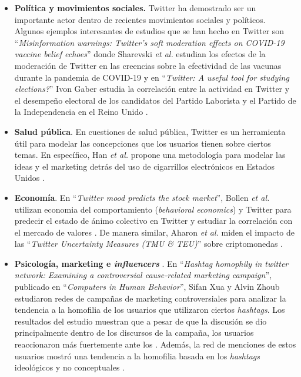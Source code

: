 \begin{itemize}

    \item \textbf{Política y movimientos sociales.} Twitter ha demostrado ser un importante actor dentro de recientes movimientos sociales y políticos. Algunos ejemplos interesantes de estudios que se han hecho en Twitter son \enquote{\textit{Misinformation warnings: Twitter’s soft moderation effects on COVID-19 vaccine belief echoes}} donde Sharevski \textit{et al.} estudian los efectos de la moderación de Twitter en las creencias sobre la efectividad de las vacunas durante la pandemia de COVID-19 \cite{sharevski_misinformation_2022} y en \enquote{\textit{Twitter: A useful tool for studying elections?}} Ivon Gaber estudia la correlación entre la actividad en Twitter y el desempeño electoral de los candidatos del Partido Laborista y el Partido de la Independencia en el Reino Unido \cite{gaber_twitter_2017}.

    \item \textbf{Salud pública}. En cuestiones de salud pública, Twitter es un herramienta útil para modelar las concepciones que los usuarios tienen sobre ciertos temas. En específico, Han \textit{et al.} propone una metodología para modelar las ideas y el marketing detrás del uso de cigarrillos electrónicos en Estados Unidos \cite{spiro_exploratory_2016}.

    \item \textbf{Economía}. En \enquote{\textit{Twitter mood predicts the stock market}}, Bollen \textit{et al.} utilizan economia del comportamiento (\textit{behavioral economics}) y Twitter para predecir el estado de ánimo colectivo en Twitter y estudiar la correlación con el mercado de valores \cite{bollen_twitter_2011}. De manera similar, Aharon \textit{et al.} miden el impacto de las \enquote{\textit{Twitter Uncertainty Measures (TMU \& TEU)}} sobre criptomonedas \cite{aharon_twitter-based_2022}.

    \item \textbf{Psicología, marketing e \textit{influencers} }. En \enquote{\textit{Hashtag homophily in twitter network: Examining a controversial cause-related marketing campaign}}, publicado en \enquote{\textit{Computers in Human Behavior}}, Sifan Xua y Alvin Zhoub estudiaron redes de campañas de marketing controversiales para analizar la tendencia a la homofilia de los usuarios que utilizaron ciertos \textit{hashtags}. Los resultados del estudio muestran que a pesar de que la discusión se dio principalmente dentro de los discursos de la campaña, los usuarios reaccionaron más fuertemente ante los . Además, la red de menciones de estos usuarios mostró una tendencia a la homofilia basada en los \textit{hashtags} ideológicos y no conceptuales \cite{xu_hashtag_2020}.


\end{itemize}
